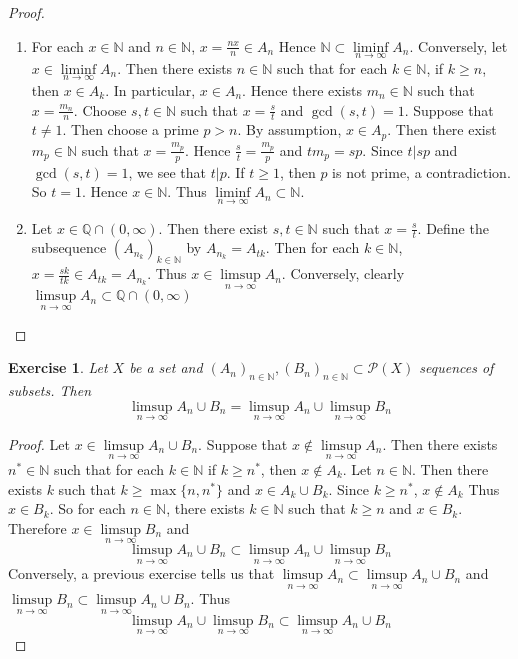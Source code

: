 \documentclass[12pt]{amsart}
\newtheorem{ex}[thm]{Exercise}
\newcommand{\N}{\mathbb{N}}
\newcommand{\Q}{\mathbb{Q}}
\newcommand{\MP}{\mathcal{P}}
\begin{document}
\begin{proof}\
\begin{enumerate}
\item For each $x \in \N$ and $n \in \N$, $x = \frac{nx}{n} \in A_n$ Hence $\N \subset \liminf\limits_{n \rightarrow \infty }A_n$. Conversely, let $x \in \liminf\limits_{n \rightarrow \infty }A_n$. Then there exists $n \in \N$ such that for each $k \in \N$, if $k \geq n$, then $x \in A_k$. In particular, $x \in A_n$. Hence there exists $m_n \in \N$ such that $x = \frac{m_n}{n}$. Choose $s,t \in \N$ such that $x= \frac{s}{t}$ and $\gcd(s,t) = 1$. Suppose that $t \neq 1$. Then choose a prime $p > n$. By assumption, $x \in A_p$. Then there exist $m_p \in \N$ such that $x = \frac{m_p}{p}$. Hence $\frac{s}{t} = \frac{m_p}{p}$ and $tm_p = sp$. Since $t \vert sp$ and $\gcd(s,t) = 1$, we see that $t \vert p$. If $t \geq 1$, then $p$ is not prime, a contradiction. So $t = 1$. Hence $x \in \N$. Thus $\liminf\limits_{n \rightarrow \infty }A_n \subset \N$. 
\item Let $x \in \Q \cap (0, \infty)$. Then there exist $s,t \in \N$ such that $x = \frac{s}{t}$. Define the subsequence $(A_{n_k})_{k \in \N}$ by $A_{n_k} = A_{tk}$. Then for each $k \in \N$, $x = \frac{sk}{tk} \in A_{tk} = A_{n_k}$. Thus $x \in \limsup\limits_{n \rightarrow \infty }A_n$. Conversely, clearly $\limsup\limits_{n \rightarrow \infty }A_n \subset \Q \cap (0, \infty)$ 
\end{enumerate}
\end{proof}

\begin{ex}
Let $X$ be a set and $(A_n)_{n \in \N}, (B_n)_{n \in \N} \subset \MP(X)$ sequences of subsets. Then $$\limsup\limits_{n \rightarrow \infty} A_n \cup B_n= \limsup\limits_{n \rightarrow \infty} A_n \cup \limsup\limits_{n \rightarrow \infty} B_n$$
\end{ex}

\begin{proof}
Let $x \in \limsup\limits_{n \rightarrow \infty} A_n \cup B_n$. Suppose that $x \not \in \limsup\limits_{n \rightarrow \infty} A_n$. Then there exists $n^* \in \N$ such that for each $k \in \N$ if $ k \geq n^*$, then $x \not \in A_k$. Let $n \in \N$. Then there exists $k$ such that $k \geq \max\{n, n^*\}$ and $x \in A_{k} \cup B_k$. Since $k \geq n^*$, $x \not \in A_{k}$ Thus $x \in B_k$. So for each $n \in \N$, there exists $k \in \N$ such that $k \geq n$ and $x \in B_k$. Therefore $x \in \limsup\limits_{n \rightarrow \infty}  B_n$ and $$\limsup\limits_{n \rightarrow \infty} A_n \cup B_n \subset \limsup\limits_{n \rightarrow \infty} A_n \cup \limsup\limits_{n \rightarrow \infty} B_n$$ Conversely, a previous exercise tells us that $\limsup\limits_{n \rightarrow \infty} A_n \subset \limsup\limits_{n \rightarrow \infty} A_n \cup B_n$ and $\limsup\limits_{n \rightarrow \infty}  B_n \subset \limsup\limits_{n \rightarrow \infty} A_n \cup B_n$. Thus $$ \limsup\limits_{n \rightarrow \infty} A_n \cup \limsup\limits_{n \rightarrow \infty} B_n \subset \limsup\limits_{n \rightarrow \infty} A_n \cup B_n$$
\end{proof}
\end{document}
